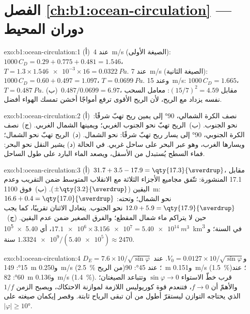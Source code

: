 \section*{الفصل \ref{ch:b1:ocean-circulation} --- دوران المحيط}

\begin{solution}{exo:b1:ocean-circulation:1}
(أ)~عند \qty{4}{m/s} (الصيغة الأولى): $1000\,C_D = 0.29 + 0.775 + 0.481 = 1.546$،
$T = 1.3 \times \num{1.546e-3} \times 16 = \qty{0.0322}{Pa}$. عند \qty{7}{m/s}
(الصيغة الثانية): $1000\,C_D = 0.60 + 0.497 = 1.097$، $T = \qty{0.0699}{Pa}$. وعند
\qty{15}{m/s}: $1000\,C_D = 1.665$، $T = \qty{0.487}{Pa}$. (ب)~$0.487/0.0699 =
6.97$، مقابل $(15/7)^2 = 4.59$: معامل السحب نفسه يزداد مع الريح، لأن الريح الأقوى ترفع أمواجًا أخشن تمسك الهواء أفضل.
\end{solution}

\begin{solution}{exo:b1:ocean-circulation:2}
(أ)~نصف الكرة الشمالي، \ang{90} إلى يمين ريح تهبّ شرقًا: نحو الجنوب. (ب)~الريح تهبّ نحو الجنوب الغربي؛ ويمينها الشمال الغربي. (ج)~نصف الكرة الجنوبي، \ang{90} إلى يسار ريح تهبّ شرقًا: نحو الشمال. (د)~الريح تهبّ نحو الشمال؛ ويسارها الغرب، وهو عبر البحر على ساحل غربي. في الحالة (د) يشير النقل نحو البحر: فماء السطح يُستبدل من الأسفل، ويصعد الماء البارد على طول الساحل.
\end{solution}

\begin{solution}{exo:b1:ocean-circulation:3}
(أ)~$31.7 + 3.5 - 17.9 = \qty{17.3}{\sverdrup}$، مقابل \qty{17.1}{\sverdrup} المنشورة: تتّفق مجاميع الأجزاء الثلاثة مع الانقلاب المتوسط ضمن التقريب وعدم اليقين ($\pm\qty{3.2}{\sverdrup}$).
(ب)~فوق \qty{1100}{m}: $16.6 + 0.4 = \qty{17.0}{\sverdrup}$ نحو الشمال؛ وتحته: $12.0 + 5.9 = \qty{17.9}{\sverdrup}$ نحو الجنوب. يتعادل الاثنان تقريبًا، كما يجب حين لا يتراكم ماء شمال المقطع؛ والفرق الصغير ضمن عدم اليقين. (ج)~$\num{17.1e6} \times \num{3.156e7} = \qty{5.40e14}{m^3}$، أي \qty{5.40e5}{km^3} في السنة؛ و$\num{1.3324e9}/(\num{5.40e5}) \approx 2470$ سنة.
\end{solution}

\begin{solution}{exo:b1:ocean-circulation:4}
$D_E = 7.6 \times 10/\sqrt{\sin\varphi}$ و$V_0 = 0.0127 \times
10/\sqrt{\sin\varphi}$. عند \ang{15}: \qty{149}{m} و\qty{0.250}{m/s}
(\qty{2.5}{\percent} من الريح)؛ عند \ang{45}: \qty{90}{m} و\qty{0.151}{m/s}
(\qty{1.5}{\percent})؛ عند \ang{60}: \qty{82}{m} و\qty{0.136}{m/s}
(\qty{1.4}{\percent}). قرب خطّ الاستواء $\sin\varphi \to 0$ وتتباعد الصيغتان؛ والأهمّ أن $f \to 0$، فتنعدم قوة كوريوليس اللازمة لموازنة الاحتكاك، ويصبح الزمن $1/f$ الذي يحتاجه التوازن ليستقرّ أطول من أن تبقى الرياح ثابتة. وقصر إيكمان صيغته على $|\varphi| \geq
\ang{10}$.
\end{solution}

